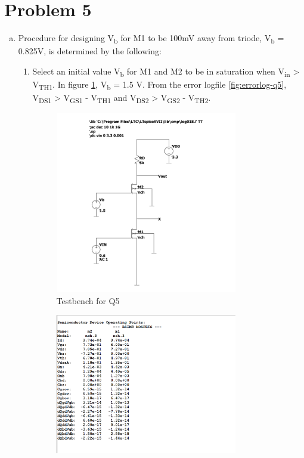 \documentclass{article}
\begin{document}
\section{Problem 5}
\label{sec:orgaf0e0cb}
\begin{enumerate}[(a)]
\item Procedure for designing V\textsubscript{b} for M1 to be 100mV away from triode, V\textsubscript{b} = 0.825V, is determined by the following:
\begin{enumerate}[1.]
\item Select an initial value V\textsubscript{b} for M1 and M2 to be in saturation when V\textsubscript{in} > V\textsubscript{TH1}. In figure \ref{fig:testbench-q5}, V\textsubscript{b} = 1.5 V.
From the error logfile \ref{fig:errorlog-q5}, V\textsubscript{DS1} > V\textsubscript{GS1} - V\textsubscript{TH1} and V\textsubscript{DS2} > V\textsubscript{GS2} - V\textsubscript{TH2}.
\begin{figure}[H]
\centering
\includegraphics[width=300px]{img/q5/testbench-q5.pdf}
\caption{\label{fig:testbench-q5}Testbench for Q5}
\end{figure}
\begin{figure}[H]
\centering
\includegraphics[width=300px]{img/q5/errorlog-q5.png}

\end{figure}
\end{enumerate}
\end{enumerate}
\end{document}
